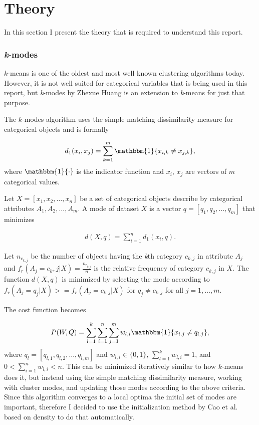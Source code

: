 \documentclass[result.tex]{subfiles}
\begin{document}
\section*{\centering Theory}

In this section I present the theory that is required to understand this report.

\subsubsection*{\textit{k}-modes}

$k$-means is one of the oldest and most well known clustering algorithms today. However, it is not well suited for categorical variables that is being used in this report, but \textit{k}-modes by Zhexue Huang \cite{huang1998extensions} is an extension to \textit{k}-means for just that purpose.

The $k$-modes algorithm uses the simple matching dissimilarity measure for categorical objects and is formally

\begin{align*}
d_1(x_i, x_j) = \sum_{k=1}^{m}  \mathbbm{1} \{ x_{i,k} \neq x_{j,k} \},
\end{align*}
where $\mathbbm{1} \{ \cdot \}$ is the indicator function and $x_i$, $x_j$ are vectors of $m$ categorical values.

Let $X = \left[ x_1, x_2, \ldots, x_n \right]$ be a set of categorical objects describe by categorical attributes $A_1, A_2, \ldots, A_m$. A mode of dataset $X$ is a vector $q = \left[ q_1, q_2, \ldots, q_m \right]$ that minimizes

\begin{align*}
d(X, q) = \sum_{i=1}^{n} d_1(x_i, q).
\end{align*}

Let $n_{c_{k, j}}$ be the number of objects having the \textit{k}th category $c_{k,j}$ in attribute $A_j$ and $f_r(A_j = c_k,j | X) = \frac{n_{c_{k,j}}}{n}$ is the relative frequency of category $c_{k,j}$ in $X$. The function $d(X, q)$ is minimized by selecting the mode according to $f_r(A_j = q_j | X) >= f_r(A_j = c_{k,j} | X)$ for $q_j \neq c_{k,j}$ for all $j = 1, \ldots, m$.

The cost function becomes

\begin{align*}
P(W, Q) = \sum_{l=1}^{k} \sum_{i=1}^{n} \sum_{j=1}^{m} w_{l,i} \mathbbm{1} \{ x_{i,j} \neq q_{l, j} \},
\end{align*}
where $q_{l} = \left[ q_{l,1}, q_{l,2}, \ldots, q_{l,m} \right]$ and $w_{l,i} \in \{ 0, 1 \}$, $\sum_{l=1}^{k} w_{l,i} = 1$, and $0 < \sum_{i=1}^{n} w_{l,i} < n$. This can be minimized iteratively similar to how $k$-means does it, but instead using the simple matching dissimilarity measure, working with cluster modes, and updating those modes according to the above criteria. Since this algorithm converges to a local optima the initial set of modes are important, therefore I decided to use the initialization method by Cao et al. \cite{cao2009new} based on density to do that automatically.
\end{document}
